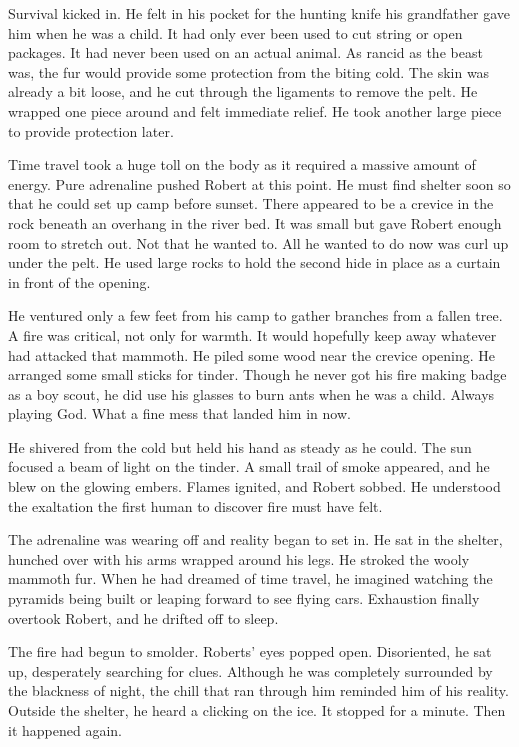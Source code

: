 \documentclass{article}
\begin{document}
\begin{tcolorbox}[colback=white, colframe=my-green, coltitle=black, parskip=5mm, title=
    \textbf{Human-written Story}, breakable]
       Survival kicked in. He felt in his pocket for the hunting knife his grandfather gave him when he was a child. It had only ever been used to cut string or open packages. It had never been used on an actual animal. As rancid as the beast was, the fur would provide some protection from the biting cold. The skin was already a bit loose, and he cut through the ligaments to remove the pelt. He wrapped one piece around and felt immediate relief. He took another large piece to provide protection later.  \\\par
       Time travel took a huge toll on the body as it required a massive amount of energy. Pure adrenaline pushed Robert at this point. He must find shelter soon so that he could set up camp before sunset. There appeared to be a crevice in the rock beneath an overhang in the river bed. It was small but gave Robert enough room to stretch out. Not that he wanted to. All he wanted to do now was curl up under the pelt. He used large rocks to hold the second hide in place as a curtain in front of the opening.  \\\par
       He ventured only a few feet from his camp to gather branches from a fallen tree. A fire was critical, not only for warmth. It would hopefully keep away whatever had attacked that mammoth. He piled some wood near the crevice opening. He arranged some small sticks for tinder. Though he never got his fire making badge as a boy scout, he did use his glasses to burn ants when he was a child. Always playing God. What a fine mess that landed him in now.  \\\par
        He shivered from the cold but held his hand as steady as he could. The sun focused a beam of light on the tinder. A small trail of smoke appeared, and he blew on the glowing embers. Flames ignited, and Robert sobbed. He understood the exaltation the first human to discover fire must have felt.  \\\par
       The adrenaline was wearing off and reality began to set in. He sat in the shelter, hunched over with his arms wrapped around his legs. He stroked the wooly mammoth fur. When he had dreamed of time travel, he imagined watching the pyramids being built or leaping forward to see flying cars. Exhaustion finally overtook Robert, and he drifted off to sleep.  \\\par
       The fire had begun to smolder. Roberts' eyes popped open. Disoriented, he sat up, desperately searching for clues. Although he was completely surrounded by the blackness of night, the chill that ran through him reminded him of his reality. Outside the shelter, he heard a clicking on the ice. It stopped for a minute. Then it happened again.  \\\par

\end{tcolorbox}
\end{document}
